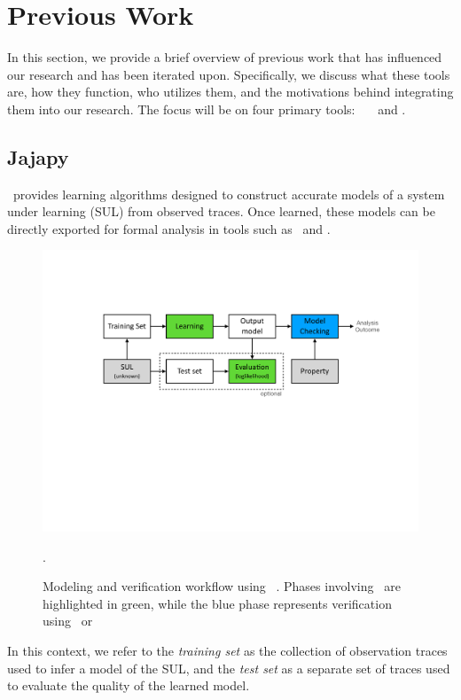 \section{Previous Work}\label{sec:jajapy_and_cupaal}
In this section, we provide a brief overview of previous work that has influenced our research and has been iterated upon.
Specifically, we discuss what these tools are, how they function, who utilizes them, and the motivations behind integrating them into our research.
The focus will be on four primary tools: \Prism\, \Storm\, \Jajapy\ and \Cupaal.


\subsection{Jajapy}\label{sec:jajapy}
\Jajapy\ provides learning algorithms designed to construct accurate models of a system under learning (SUL) from observed traces.
Once learned, these models can be directly exported for formal analysis in tools such as \Storm~and \Prism.


\begin{figure}
    \centering
    \includegraphics[width=\columnwidth]{figures/workflow.pdf}
    \caption{Modeling and verification workflow using \Jajapy~\cite{alearninglibraryforstochasticmodels}. Phases involving \Jajapy\ are highlighted in green, while the blue phase represents verification using \Storm\ or \Prism}.
    \label{fig:workflow}
\end{figure}


In this context, we refer to the \textit{training set} as the collection of observation traces used to infer a model of the SUL, and the \textit{test set} as a separate set of traces used to evaluate the quality of the learned model.

